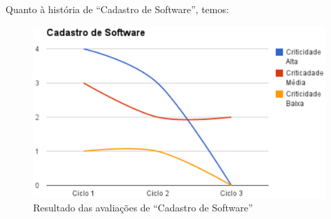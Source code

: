 Quanto à história de ``Cadastro de  Software'', temos:

\begin{figure}[h!]
    	\centering
    	\includegraphics[keepaspectratio=true,scale=0.62]
      		{figuras/graf03.eps}
    	\caption{Resultado das avaliações de ``Cadastro de Software''}
    	\label{avaliacaosoftware}
\end{figure}

